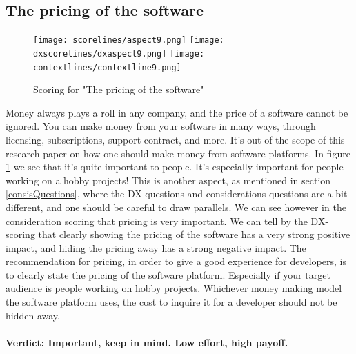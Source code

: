 \documentclass{cslthse-msc}
\begin{document}
    \subsection{The pricing of the software}
    \begin{figure}[H]
        \centering
        \texttt{[image: scorelines/aspect9.png]}
        \texttt{[image: dxscorelines/dxaspect9.png]}
        \texttt{[image: contextlines/contextline9.png]}
        \caption{Scoring for "The pricing of the software"}
        \label{fig:aspect9}
    \end{figure}
    Money always plays a roll in any company, and the price of a software cannot be ignored. You can make money from your software in many ways, through licensing, subscriptions, support contract, and more. It's out of the scope of this research paper on how one should make money from software platforms. In figure \ref{fig:aspect9} we see that it's quite important to people. It's especially important for people working on a hobby projects! This is another aspect, as mentioned in section \ref{consisQuestions}, where the DX-questions and considerations questions are a bit different, and one should be careful to draw parallels. We can see however in the consideration scoring that pricing is very important. We can tell by the DX-scoring that clearly showing the pricing of the software has a very strong positive impact, and hiding the pricing away has a strong negative impact. The recommendation for pricing, in order to give a good experience for developers, is to clearly state the pricing of the software platform. Especially if your target audience is people working on hobby projects. Whichever money making model the software platform uses, the cost to inquire it for a developer should not be hidden away. \\ \\
    \textbf{Verdict: Important, keep in mind. Low effort, high payoff.}
\end{document}
